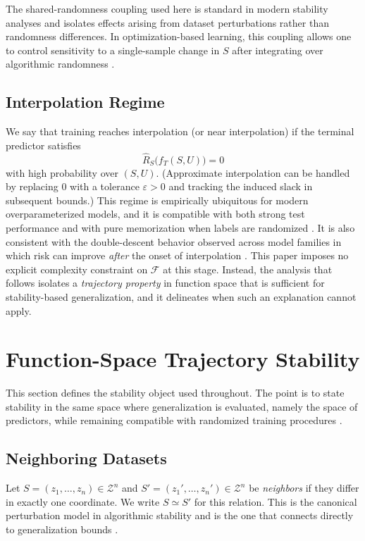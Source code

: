 \documentclass{article}
\numberwithin{equation}{section}
\begin{document}
The shared-randomness coupling used here is standard in modern stability analyses and isolates effects arising from dataset perturbations rather than randomness differences. In optimization-based learning, this coupling allows one to control sensitivity to a single-sample change in $S$ after integrating over algorithmic randomness \cite{pmlr-v48-hardt16}.

\subsection{Interpolation Regime}
\label{subsec:interpolation}

We say that training reaches interpolation (or near interpolation) if the terminal predictor satisfies
\[
\widehat{R}_S\!\big(f_T(S,U)\big)=0
\]
with high probability over $(S,U)$. (Approximate interpolation can be handled by replacing $0$ with a tolerance $\varepsilon>0$ and tracking the induced slack in subsequent bounds.) This regime is empirically ubiquitous for modern overparameterized models, and it is compatible with both strong test performance and with pure memorization when labels are randomized \cite{DBLP:conf/iclr/ZhangBHRV17}. It is also consistent with the double-descent behavior observed across model families in which risk can improve \emph{after} the onset of interpolation \cite{belkin2019double}. This paper imposes no explicit complexity constraint on $\mathcal{F}$ at this stage. Instead, the analysis that follows isolates a \emph{trajectory property} in function space that is sufficient for stability-based generalization, and it delineates when such an explanation cannot apply.

\section{Function-Space Trajectory Stability}
\label{sec:traj-stability}

This section defines the stability object used throughout.
The point is to state stability in the same space where generalization is evaluated, namely the space of predictors, while remaining compatible with randomized training procedures \cite{bousquet2002stability}.

\subsection{Neighboring Datasets}
\label{subsec:neighbors}

Let $S=(z_1,\dots,z_n)\in\mathcal{Z}^n$ and $S'=(z_1',\dots,z_n')\in\mathcal{Z}^n$ be \emph{neighbors} if they differ in exactly one coordinate.
We write $S\simeq S'$ for this relation.
This is the canonical perturbation model in algorithmic stability and is the one that connects directly to generalization bounds \cite{bousquet2002stability}.
\end{document}

